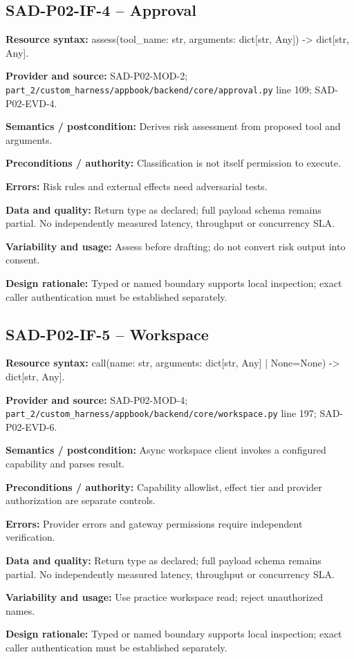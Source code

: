 \documentclass[10pt,letterpaper]{article}
\begin{document}
\subsection{SAD-P02-IF-4 -- Approval}
{\raggedright \textbf{Resource syntax:} assess(\allowbreak{}tool\_\allowbreak{}name: str, arguments: dict[str, Any]) -> dict[str, Any].\par}
\textbf{Provider and source:} SAD-P02-MOD-2; \nolinkurl{part_2/custom_harness/appbook/backend/core/approval.py} line 109; SAD-P02-EVD-4.\par
\textbf{Semantics / postcondition:} Derives risk assessment from proposed tool and arguments.\par
\textbf{Preconditions / authority:} Classification is not itself permission to execute.\par
\textbf{Errors:} Risk rules and external effects need adversarial tests.\par
\textbf{Data and quality:} Return type as declared; full payload schema remains partial. No independently measured latency, throughput or concurrency SLA.\par
\textbf{Variability and usage:} Assess before drafting; do not convert risk output into consent.\par
\textbf{Design rationale:} Typed or named boundary supports local inspection; exact caller authentication must be established separately.\par

\subsection{SAD-P02-IF-5 -- Workspace}
{\raggedright \textbf{Resource syntax:} call(\allowbreak{}name: str, arguments: dict[str, Any] | None=None) -> dict[str, Any].\par}
\textbf{Provider and source:} SAD-P02-MOD-4; \nolinkurl{part_2/custom_harness/appbook/backend/core/workspace.py} line 197; SAD-P02-EVD-6.\par
\textbf{Semantics / postcondition:} Async workspace client invokes a configured capability and parses result.\par
\textbf{Preconditions / authority:} Capability allowlist, effect tier and provider authorization are separate controls.\par
\textbf{Errors:} Provider errors and gateway permissions require independent verification.\par
\textbf{Data and quality:} Return type as declared; full payload schema remains partial. No independently measured latency, throughput or concurrency SLA.\par
\textbf{Variability and usage:} Use practice workspace read; reject unauthorized names.\par
\textbf{Design rationale:} Typed or named boundary supports local inspection; exact caller authentication must be established separately.\par
\end{document}
